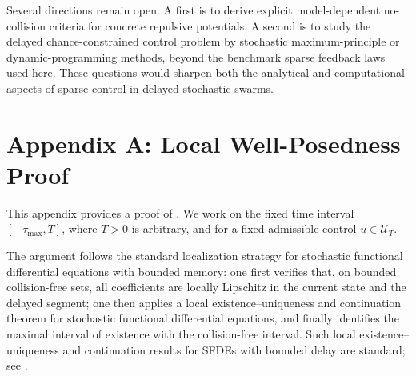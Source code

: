 \documentclass[pdflatex,sn-mathphys-num]{sn-jnl}%
\numberwithin{equation}{section}
\theoremstyle{thmstyleone}%
\theoremstyle{remark}
\theoremstyle{definition}
\newcommand{\calU}{\mathcal{U}}
\begin{document}
Several directions remain open. A first is to derive explicit
model-dependent no-collision criteria for concrete repulsive potentials.
A second is to study the delayed chance-constrained control problem by
stochastic maximum-principle or dynamic-programming methods, beyond the
benchmark sparse feedback laws used here. These questions would sharpen both the
analytical and computational aspects of sparse control in delayed
stochastic swarms.
\appendix
\section{Appendix A: Local Well-Posedness Proof}
\label{app:local-proof}
This appendix provides a proof of . We work on the fixed
time interval $[-\tau_{\max},T]$, where $T>0$ is arbitrary, and for a fixed
admissible control $u\in\calU_T$.

The argument follows the standard localization strategy for stochastic
functional differential equations with bounded memory: one first verifies
that, on bounded collision-free sets, all coefficients are locally Lipschitz
in the current state and the delayed segment; one then applies a local
existence--uniqueness and continuation theorem for stochastic functional
differential equations, and finally identifies the maximal interval of
existence with the collision-free interval. Such local
existence--uniqueness and continuation results for SFDEs with bounded
delay are standard; see \cite{mohammed1984stochastic,mao2007stochastic,von2010existence}.
\end{document}
